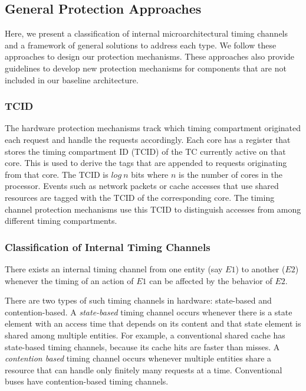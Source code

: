 
\subsection{General Protection Approaches}
\label{sec:general_approaches}

Here, we present a classification of internal microarchitectural timing channels 
and a framework of general solutions to address each type.
We follow these approaches to design our
protection mechanisms. These approaches also provide guidelines to
develop new protection mechanisms for components that are not included in
our baseline architecture.

\subsubsection{TCID}

The hardware protection mechanisms track which timing compartment originated 
each request and handle the requests accordingly. Each core has a register that 
stores the timing compartment ID (TCID) of the TC currently active on that core. This is used to derive 
the tags that are appended to requests originating from that core. The TCID is 
$log\ n$ bits where $n$ is the number of cores in the processor.
Events such as network packets or cache accesses that use shared resources are 
tagged with the TCID of the corresponding core. 
The timing channel protection mechanisms use this TCID to distinguish accesses
from among different timing compartments.

\subsubsection{Classification of Internal Timing Channels}

There exists an internal timing channel from one entity (say $E1$)
to another ($E2$) whenever the timing of an action of $E1$ can be affected 
by the behavior of $E2$.

There are two types of such timing channels in hardware: state-based
and contention-based.
A \emph{state-based} timing channel occurs whenever there is a state element 
with an access time that depends on its content and that state element is 
shared among multiple entities.
For example, a conventional shared cache has state-based timing channels, because 
its cache hits are faster than misses.
A \emph{contention based} timing channel occurs whenever multiple entities 
share a resource that can handle only finitely many requests at a time.
Conventional buses have contention-based timing channels.


